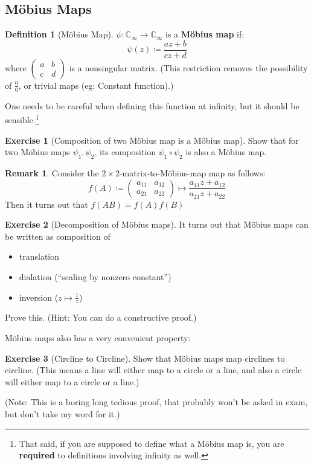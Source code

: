 \documentclass[a4paper, 12pt]{article}
\theoremstyle{definition}
\newtheorem{definition}{Definition}
\newtheorem{exercise}{Exercise}
\newtheorem{remark}{Remark}
\numberwithin{theorem}{section}
\numberwithin{definition}{section}
\numberwithin{exercise}{section}
\numberwithin{remark}{section}
\numberwithin{figure}{section}
\numberwithin{example}{section}
\newcommand{\C}{\mathbb{C}}
\begin{document}
\subsection{M\"obius Maps}
\begin{definition}[M\"obius Map]
    $\psi : \C_{\infty} \rightarrow \C_{\infty}$ is a \textbf{M\"obius map} if:
    \begin{equation*}
        \psi \left( z \right) \coloneqq \frac{az + b}{cz + d}
    \end{equation*}
    where $
    \begin{pmatrix}
        a & b \\ c & d
    \end{pmatrix}
    $ is a nonsingular matrix.
    (This restriction removes the possibility of $\frac{0}{0}$,
    or trivial maps (eg: Constant function).)

    One needs to be careful when defining this function at infinity,
    but it should be sensible.\footnote{
    That said, if you are supposed to define what a M\"obius map is,
    you are \textbf{required} to definitions involving infinity as well.
    }
\end{definition}
\begin{exercise}[Composition of two M\"obius map is a M\"obius map]
    Show that for two M\"obius maps $\psi_1, \psi_2$,
    its composition $\psi_1 \circ \psi_2$ is also a M\"obius map.
\end{exercise}
\begin{remark}
    Consider the $2 \times 2$-matrix-to-M\"obius-map map as follows:
    \begin{equation*}
        f (A) \coloneqq
        \begin{pmatrix}
            a_{11} & a_{12} \\ a_{21} & a_{22}
        \end{pmatrix}
        \mapsto
        \frac{a_{11} z + a_{12}}{a_{21} z + a_{22}}
    \end{equation*}
    Then it turns out that
    $f\left( AB \right) = f(A) f(B)$
\end{remark}
\begin{exercise}[Decomposition of M\"obius maps]
    It turns out that M\"obius maps can be written as composition of
    \begin{itemize}
        \item translation
        \item dialation (``scaling by nonzero constant'')
        \item inversion ($z \mapsto \frac{1}{z}$)
    \end{itemize}
    Prove this. (Hint: You can do a constructive proof.)
\end{exercise}
M\"obius maps also has a very convenient property:
\begin{exercise}[Circline to Circline]
    Show that M\"obius maps map circlines to circline.
    (This means a line will either map to a circle or a line,
    and also a circle will either map to a circle or a line.)

    (Note: This is a boring long tedious proof, that probably won't be asked in exam,
    but don't take my word for it.)
\end{exercise}
\end{document}
